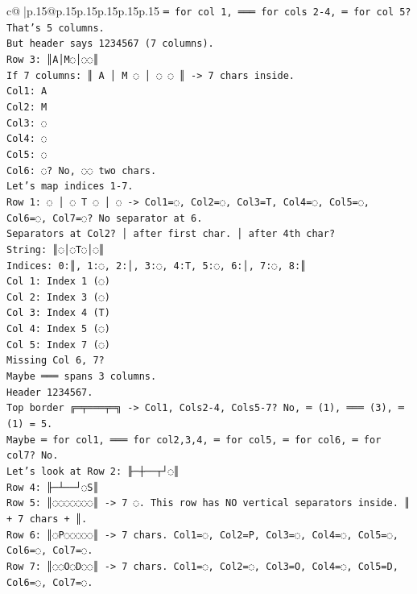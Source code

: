 \documentclass{article}
\begin{document}
{\begin{supertabular}{c@{$\;$}|p{.15\linewidth}@{}p{.15\linewidth}p{.15\linewidth}p{.15\linewidth}p{.15\linewidth}p{.15\linewidth}}
{{{\texttt{═ for col 1, ═══ for cols 2{-}4, ═ for col 5? That's 5 columns.} \\
\texttt{But header says 1234567 (7 columns).} \\
\texttt{Row 3: ║A│M◌│◌◌║} \\
\texttt{If 7 columns: ║ A │ M ◌ │ ◌ ◌ ║ {-}> 7 chars inside.} \\
\texttt{Col1: A} \\
\texttt{Col2: M} \\
\texttt{Col3: ◌} \\
\texttt{Col4: ◌} \\
\texttt{Col5: ◌} \\
\texttt{Col6: ◌? No, ◌◌ two chars.} \\
\texttt{Let's map indices 1{-}7.} \\
\texttt{Row 1: ◌ │ ◌ T ◌ │ ◌ {-}> Col1=◌, Col2=◌, Col3=T, Col4=◌, Col5=◌, Col6=◌, Col7=◌? No separator at 6.} \\
\texttt{Separators at Col2? │ after first char. │ after 4th char?} \\
\texttt{String: ║◌│◌T◌│◌║} \\
\texttt{Indices: 0:║, 1:◌, 2:│, 3:◌, 4:T, 5:◌, 6:│, 7:◌, 8:║} \\
\texttt{Col 1: Index 1 (◌)} \\
\texttt{Col 2: Index 3 (◌)} \\
\texttt{Col 3: Index 4 (T)} \\
\texttt{Col 4: Index 5 (◌)} \\
\texttt{Col 5: Index 7 (◌)} \\
\texttt{Missing Col 6, 7?} \\
\texttt{Maybe ═══ spans 3 columns.} \\
\texttt{Header 1234567.} \\
\texttt{Top border ╔═╤═══╤═╗ {-}> Col1, Cols2{-}4, Cols5{-}7? No, ═ (1), ═══ (3), ═ (1) = 5.} \\
\texttt{Maybe ═ for col1, ═══ for col2,3,4, ═ for col5, ═ for col6, ═ for col7? No.} \\
\texttt{Let's look at Row 2: ╟─┼──┬┘◌║} \\
\texttt{Row 4: ╟─┴──┘◌S║} \\
\texttt{Row 5: ║◌◌◌◌◌◌◌║ {-}> 7 ◌. This row has NO vertical separators inside. ║ + 7 chars + ║.} \\
\texttt{Row 6: ║◌P◌◌◌◌◌║ {-}> 7 chars. Col1=◌, Col2=P, Col3=◌, Col4=◌, Col5=◌, Col6=◌, Col7=◌.} \\
\texttt{Row 7: ║◌◌O◌D◌◌║ {-}> 7 chars. Col1=◌, Col2=◌, Col3=O, Col4=◌, Col5=D, Col6=◌, Col7=◌.} \\
}}}
\end{supertabular}}
\end{document}
